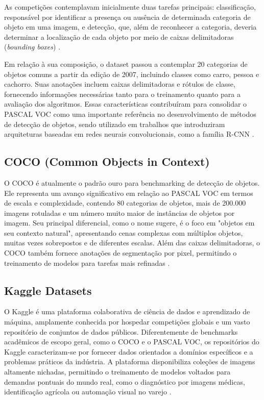 As competições contemplavam inicialmente duas tarefas principais: classificação, responsável
por identificar a presença ou ausência de determinada categoria de objeto em uma imagem, e
detecção, que, além de reconhecer a categoria, deveria determinar a localização de cada objeto
por meio de caixas delimitadoras (\textit{bounding boxes}) \cite{everingham2010pascal}.

Em relação à sua composição, o dataset passou a contemplar 20 categorias de objetos comuns a
partir da edição de 2007, incluindo classes como carro, pessoa e cachorro. Suas anotações
incluem caixas delimitadoras e rótulos de classe, fornecendo informações necessárias tanto
para o treinamento quanto para a avaliação dos algoritmos. Essas características contribuíram
para consolidar o PASCAL VOC como uma importante referência no desenvolvimento de métodos de
detecção de objetos, sendo utilizado em trabalhos que introduziram arquiteturas baseadas em
redes neurais convolucionais, como a família R-CNN \cite{Girshick_2014_CVPR}.

\subsection{COCO (Common Objects in Context)}

O COCO é atualmente o padrão ouro para benchmarking de detecção de objetos. Ele representa um
avanço significativo em relação ao PASCAL VOC em termos de escala e complexidade, contendo 80
categorias de objetos, mais de 200.000 imagens rotuladas e um número muito maior de instâncias
de objetos por imagem. Seu principal diferencial, como o nome sugere, é o foco em "objetos em
seu contexto natural", apresentando cenas complexas com múltiplos objetos, muitas vezes
sobrepostos e de diferentes escalas. Além das caixas delimitadoras, o COCO também fornece
anotações de segmentação por pixel, permitindo o treinamento de modelos para tarefas mais
refinadas \cite{lin2014microsoft}.

\subsection{Kaggle Datasets}

O Kaggle é uma plataforma colaborativa de ciência de dados e aprendizado de máquina,
amplamente conhecida por hospedar competições globais e um vasto repositório de conjuntos de
dados públicos. Diferentemente de benchmarks acadêmicos de escopo geral, como o COCO e o
PASCAL VOC, os repositórios do Kaggle caracterizam-se por fornecer dados orientados a domínios
específicos e a problemas práticos da indústria. A plataforma disponibiliza coleções de
imagens altamente nichadas, permitindo o treinamento de modelos voltados para demandas pontuais
do mundo real, como o diagnóstico por imagens médicas, identificação agrícola ou automação
visual no varejo \cite{kaggle2024}.

